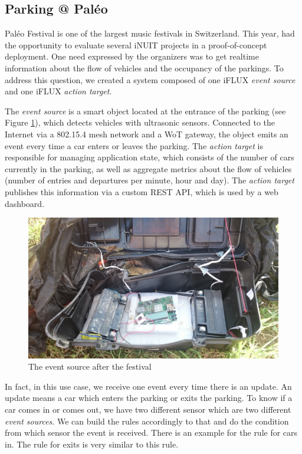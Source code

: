 \subsection{Parking @ Paléo}

Paléo Festival is one of the largest music festivals in Switzerland. This year, had the opportunity to evaluate several iNUIT projects in a proof-of-concept deployment. One need expressed by the organizers was to get realtime information about the flow of vehicles and the occupancy of the parkings. To address this question, we created a system composed of one iFLUX \emph{event source} and one iFLUX \emph{action target}. 

The \emph{event source} is a smart object located at the entrance of the parking (see Figure \ref{fig:paleo}), which detects vehicles with ultrasonic sensors. Connected to the Internet via a 802.15.4 mesh network and a WoT gateway, the object emits an event every time a car enters or leaves the parking. The \emph{action target} is responsible for managing application state, which consists of the number of cars currently in the parking, as well as aggregate metrics about the flow of vehicles (number of entries and departures per minute, hour and day). The \emph{action target} publishes this information via a custom REST API, which is used by a web dashboard.

\begin{figure}
\centering
\includegraphics[width=0.85\columnwidth]{figures/paleo-after.png}
\caption{The event source after the festival}
\label{fig:paleo}
\end{figure}

In fact, in this use case, we receive one event every time there is an update. An update means a car which enters the parking or exits the parking. To know if a car comes in or comes out, we have two different sensor which are two different \emph{event sources}. We can build the rules accordingly to that and do the condition from which sensor the event is received. There is an example for the rule for cars in. The rule for exits is very similar to this rule.

